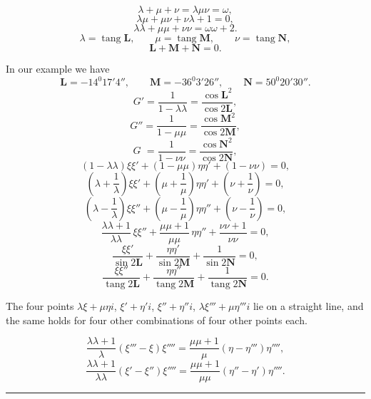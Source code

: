 
\[
\lambda+\mu+\nu=\lambda\mu\nu=\omega,
\]
\[
\lambda\mu+\mu\nu+\nu\lambda+1=0,
\]
\[
\lambda\lambda+\mu\mu+\nu\nu=\omega\omega+2.
\]
\[
\lambda=\operatorname{tang}\boldsymbol{L}, \qquad \mu=\operatorname{tang}\boldsymbol{M}, \qquad \nu=\operatorname{tang}\boldsymbol{N},
\]
\[
\boldsymbol{L}+\boldsymbol{M}+\boldsymbol{N}=0.
\]

In our example we have
\[
\boldsymbol{L}=-14^{0}17'4'', \qquad \boldsymbol{M}=-36^{0}3'26'', \qquad \boldsymbol{N}=50^{0}20'30''.
\]
\[
G'=\frac{1}{1-\lambda\lambda}=\frac{\cos \boldsymbol{L}^{2}}{\cos 2\boldsymbol{L}},
\]
\[
G''=\frac{1}{1-\mu\mu}=\frac{\cos \boldsymbol{M}^{2}}{\cos 2\boldsymbol{M}},
\]
\[
G\phantom{'}=\frac{1}{1-\nu\nu}=\frac{\cos \boldsymbol{N}^{2}}{\cos 2\boldsymbol{N}},
\]
\[
(1-\lambda\lambda)\xi\xi'+(1-\mu\mu)\eta\eta'+(1-\nu\nu)=0,
\]
\[
\left(\lambda+\frac{1}{\lambda}\right)\xi\xi'+\left(\mu+\frac{1}{\mu}\right)\eta\eta'+\left(\nu+\frac{1}{\nu}\right)=0,
\]
\[
\left(\lambda-\frac{1}{\lambda}\right)\xi\xi''+\left(\mu-\frac{1}{\mu}\right)\eta\eta''+\left(\nu-\frac{1}{\nu}\right)=0,
\]
\[
\frac{\lambda\lambda+1}{\lambda\lambda}\,\xi\xi''+\frac{\mu\mu+1}{\mu\mu}\,\eta\eta''+\frac{\nu\nu+1}{\nu\nu}=0,
\]
\[
\frac{\xi\xi'}{\sin 2\boldsymbol{L}}+\frac{\eta\eta'}{\sin 2\boldsymbol{M}}+\frac{1}{\sin 2\boldsymbol{N}}=0,
\]
\[
\frac{\xi\xi''}{\operatorname{tang} 2\boldsymbol{L}}+\frac{\eta\eta''}{\operatorname{tang} 2\boldsymbol{M}}+\frac{1}{\operatorname{tang} 2\boldsymbol{N}}=0.
\]

The four points $\lambda\xi+\mu\eta i$, $\xi'+\eta'i$, $\xi''+\eta''i$, $\lambda\xi'''+\mu\eta'''i$ lie on a straight line, and the same
holds for four other combinations of four other points each.

\[
\frac{\lambda\lambda+1}{\lambda}(\xi'''-\xi)\xi''''=\frac{\mu\mu+1}{\mu}(\eta-\eta''')\eta'''',
\]
\[
\frac{\lambda\lambda+1}{\lambda\lambda}(\xi'-\xi'')\xi''''=\frac{\mu\mu+1}{\mu\mu}(\eta''-\eta')\eta''''.
\]

\begin{center}\rule{3cm}{.4pt}\end{center}
